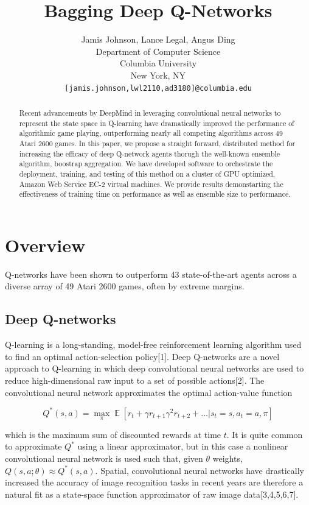 \documentclass{article} %
\title{Bagging Deep Q-Networks}
\author{
Jamis Johnson, Lance Legal, Angus Ding \\
Department of Computer Science\\
Columbia University \\
New York, NY\\
\texttt{[jamis.johnson,lwl2110,ad3180]@columbia.edu} \\
}
\DeclareMathOperator{\E}{\mathbb{E}}
\begin{document}
\maketitle

\begin{abstract}
Recent advancements by DeepMind in leveraging convolutional neural networks to 
represent the state space in Q-learning have dramatically improved the performance 
of algorithmic game playing, outperforming nearly all competing algorithms across 49
Atari 2600 games. In this paper, we propose a straight forward, distributed method for 
increasing the efficacy of deep Q-network agents thorugh the well-known ensemble algorithm,
boostrap aggregation. We have developed software to orchestrate the deployment, training, 
and testing of this method on a cluster of GPU optimized, Amazon Web Service EC-2 
virtual machines. We provide results demonstarting the effectiveness of training time
on performance as well as ensemble size to performance.
\end{abstract}

\section{Overview}
Q-networks have been shown to outperform 43 state-of-the-art agents across a 
diverse array of 49 Atari 2600 games, often by extreme margins.

\subsection{Deep Q-networks}
Q-learning is a long-standing, model-free reinforcement learning algorithm used to find 
an optimal action-selection policy[1]. Deep Q-networks are a novel approach to 
Q-learning in which deep convolutional neural networks are used to reduce high-dimensional 
raw input to a set of possible actions[2]. The convolutional neural network approximates the 
optimal action-value function

\[
Q^*(s,a) = \max_{\pi} \E \left[ r_t + \gamma r_{t+1} \gamma^2 r_{t+2} + \dots | s_t = s, a_t = a, \pi \right]
\]

which is the maximum sum of discounted rewards at time $t$. It is quite common 
to approximate $Q^*$ using a linear approximator, but in this case a 
nonlinear convolutional neural network is used such that, given $\theta$ weights, 
$Q(s,a;\theta) \approx Q^*(s,a)$. Spatial, convolutional neural networks have drastically increased 
the accuracy of image recognition tasks in recent years are therefore a natural fit as a 
state-space function approximator of raw image data[3,4,5,6,7].
\end{document}
